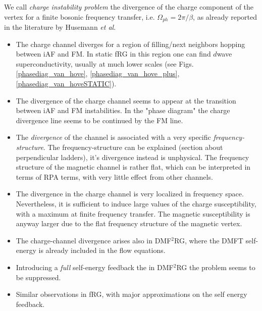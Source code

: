 We call \textit{charge instability problem} the divergence of the charge component of the vertex for a finite bosonic frequency transfer, i.e. $\Omega_{ph} = 2\pi/\beta$, as already reported in the literature by Husemann \emph{et al}. 
\begin{itemize}
\item The charge channel diverges for a region of filling/next neighbors hopping between iAF and FM. In static fRG in this region one can find $d$wave superconductivity, usually at much lower scales (see Figs. \ref{phasediag_van_hove}, \ref{phasediag_van_hove_plus}, \ref{phasediag_van_hoveSTATIC}).

\item The divergence of the charge channel seems to appear at the transition between iAF and FM instabilities. In the "phase diagram" the charge divergence line seems to be continued by the FM line. 
 
\item The \textit{divergence} of the channel is associated with a very specific \textit{frequency-structure}. The frequency-structure can be explained (section about perpendicular ladders), it's divergence instead is unphysical. 
The frequency structure of the magnetic channel is rather flat, which can be interpreted in terms of RPA terms, with very little effect from other channels. 
 
 \item The divergence in the charge channel is very localized in frequency space. 
Nevertheless, it is sufficient to induce large values of the charge susceptibility,  with a maximum at finite frequency transfer. The magnetic susceptibility is anyway larger due to the flat frequency structure of the magnetic vertex. 
 
\item The charge-channel divergence arises also in DMF$^2$RG, where the DMFT self-energy is already included in the flow equations. 

\item Introducing a \emph{full} self-energy feedback the in DMF$^2$RG the problem seems to be suppressed. 

\item Similar observations in fRG, with major approximations on the self energy feedback.

     
\end{itemize} 
 
